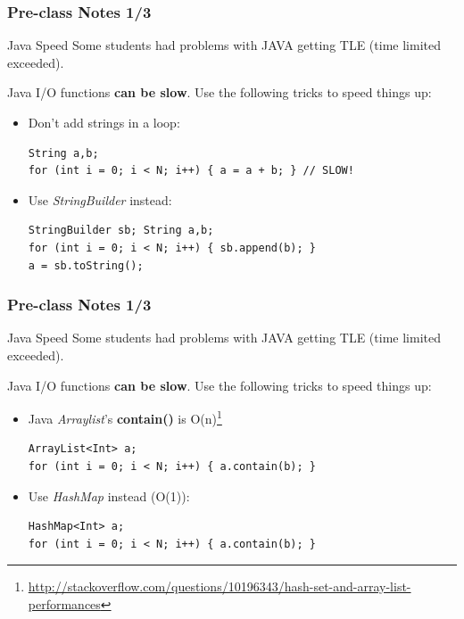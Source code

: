 \begin{frame}[fragile]
  \frametitle{Pre-class Notes 1/3}

  \begin{block}{Java Speed}
    Some students had problems with JAVA getting TLE (time limited
    exceeded).

    \bigskip

    Java I/O functions {\bf can be slow}. Use the following tricks to
    speed things up:
  \end{block}

  \begin{itemize}
      \item Don't add strings in a loop:
    {\small
\begin{verbatim}
String a,b;
for (int i = 0; i < N; i++) { a = a + b; } // SLOW!
\end{verbatim}
    }
  \item Use \emph{StringBuilder} instead:
    {\small
\begin{verbatim}
StringBuilder sb; String a,b;
for (int i = 0; i < N; i++) { sb.append(b); }
a = sb.toString();
\end{verbatim}
    }
  \end{itemize}
\end{frame}

\begin{frame}[fragile]
  \frametitle{Pre-class Notes 1/3}

  \begin{block}{Java Speed}
    Some students had problems with JAVA getting TLE (time limited
    exceeded).

    \bigskip

    Java I/O functions {\bf can be slow}. Use the following tricks to
    speed things up:
  \end{block}

  \begin{itemize}
      \item Java \emph{Arraylist}'s {\bf contain()} is O(n)\footnote{\url{http://stackoverflow.com/questions/10196343/hash-set-and-array-list-performances}}
    {\small
\begin{verbatim}
ArrayList<Int> a;
for (int i = 0; i < N; i++) { a.contain(b); }
\end{verbatim}
    }
  \item Use \emph{HashMap} instead (O(1)):
    {\small
\begin{verbatim}
HashMap<Int> a;
for (int i = 0; i < N; i++) { a.contain(b); }
\end{verbatim}
    }
  \end{itemize}
\end{frame}


